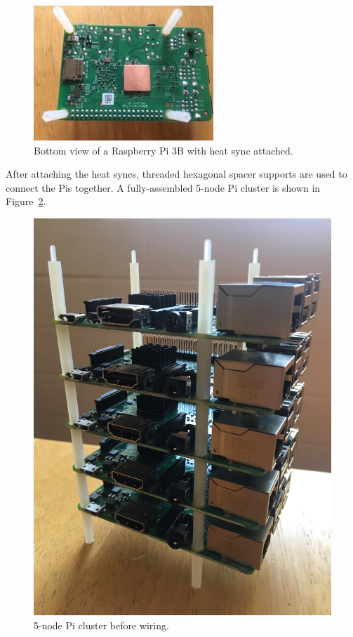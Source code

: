 \begin{figure}[!ht]
  \centering\includegraphics[width=\columnwidth]{images/heat-sync-bottom.jpg}
  \caption{Bottom view of a Raspberry Pi 3B with heat sync attached.}\label{f:heat-sync-bottom}
\end{figure}

After attaching the heat syncs, threaded hexagonal spacer supports are used to connect the Pis together. A fully-assembled 5-node Pi cluster is shown in Figure~\ref{f:cluster-no-wires}.

\begin{figure}[!ht]
  \centering\includegraphics[width=\columnwidth]{images/pi-cluster-no-wires.jpg}
  \caption{5-node Pi cluster before wiring.}\label{f:cluster-no-wires}
\end{figure}

